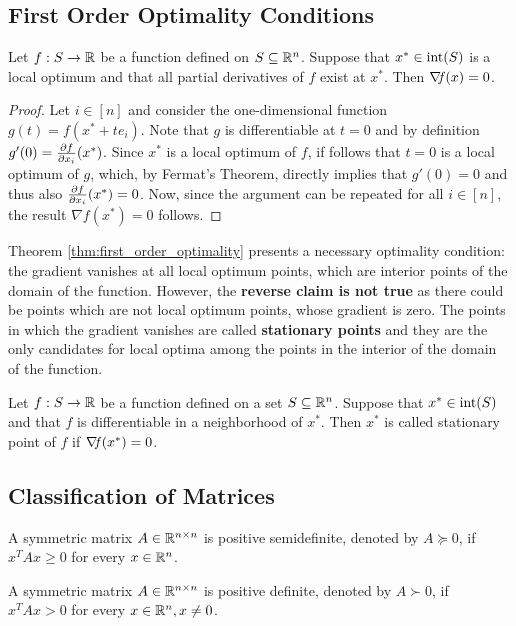\documentclass[10pt,a4paper]{article}
\begin{document}
\subsection{First Order Optimality Conditions}
\begin{theorem}\label{thm:first_order_optimality}
	Let $f:S\to \mathbb{R}$ be a function defined on $S\subseteq \mathbb{R}^n$. Suppose that $x^*\in\mathord{\mathrm{int}}(S)$ is a local optimum and that all partial derivatives of $f$ exist at $x^*$. Then $\operatorname*{\mathit{\nabla \!f}}(x)=0$.
\end{theorem}
\begin{proof}
	Let $i\in [n]$ and consider the one-dimensional function $g(t)=f(x^*+te_i)$. Note that $g$ is differentiable at $t=0$ and by definition $g'(0) = \frac{\partial f}{\partial x_i}(x^*)$. Since $x^*$ is a local optimum of $f$, if follows that $t=0$ is a local optimum of $g$, which, by Fermat's Theorem, directly implies that $g'(0) = 0$ and thus also $\frac{\partial f}{\partial x_i}(x^*)=0$. Now, since the argument can be repeated for all $i\in[n]$, the result $\nabla f(x^*) = 0$ follows.
\end{proof}
Theorem \ref{thm:first_order_optimality} presents a necessary optimality condition: the gradient vanishes at all local optimum points, which are interior points of the domain of the function. However, the \textbf{reverse claim is not true} as there could be points which are not local optimum points, whose gradient is zero. The points in which the gradient vanishes are called \textbf{stationary points} and they are the only candidates for local optima among the points in the interior of the domain of the function.
\begin{definition}
	Let $f:S\to \mathbb{R}$ be a function defined on a set $S\subseteq \mathbb{R}^n$. Suppose that $x^* \in \mathord{\mathrm{int}}(S)$ and that $f$ is differentiable in a neighborhood of $x^*$. Then $x^*$ is called stationary point of $f$ if $\operatorname*{\mathit{\nabla \!f}}(x^*)=0$.
\end{definition}
\subsection{Classification of Matrices}
\begin{definition}
	A symmetric matrix $A\in \mathbb{R}^{n\times n}$ is positive semidefinite, denoted by $A \succcurlyeq0$, if $x^TAx\geq 0$ for every $x\in \mathbb{R}^n$.
\end{definition}
\begin{definition}
	A symmetric matrix $A\in \mathbb{R}^{n\times n}$ is positive definite, denoted by $A \succ0$, if $x^TAx> 0$ for every $x\in \mathbb{R}^n, x\neq 0$.
\end{definition}
\end{document}
